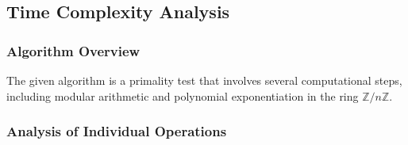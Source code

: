 \documentclass{article}
\theoremstyle{plain}
\theoremstyle{definition}
\begin{document}
\subsection{Time Complexity Analysis} \label{subsection:timecomplexity}

\subsubsection{Algorithm Overview}
The given algorithm is a primality test that involves several computational steps, including modular arithmetic and polynomial exponentiation in the ring \(\mathbb{Z}/n\mathbb{Z}\).

\subsubsection{Analysis of Individual Operations}
\end{document}
